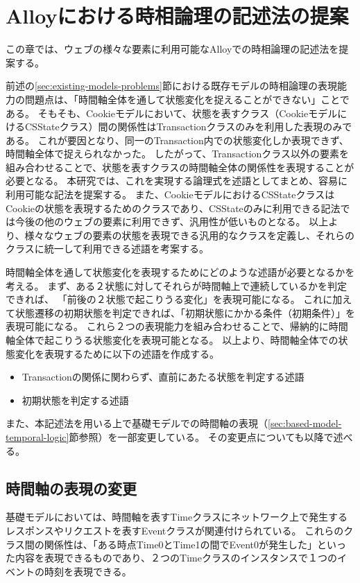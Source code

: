 \documentclass[12pt,a4paper]{jbook}
\begin{document}
\newpage

\chapter{Alloyにおける時相論理の記述法の提案}
\label{sec:ProposedModel-TemporalLogic}
この章では、ウェブの様々な要素に利用可能なAlloyでの時相論理の記述法を提案する。

前述の\ref{sec:existing-models-problems}節における既存モデルの時相論理の表現能力の問題点は、「時間軸全体を通して状態変化を捉えることができない」ことである。
そもそも、Cookieモデルにおいて、状態を表すクラス（CookieモデルにけるCSStateクラス）間の関係性はTransactionクラスのみを利用した表現のみである。
これが要因となり、同一のTransaction内での状態変化しか表現できず、時間軸全体で捉えられなかった。
したがって、Transactionクラス以外の要素を組み合わせることで、状態を表すクラスの時間軸全体の関係性を表現することが必要となる。
本研究では、これを実現する論理式を述語としてまとめ、容易に利用可能な記法を提案する。
また、CookieモデルにおけるCSStateクラスはCookieの状態を表現するためのクラスであり、CSStateのみに利用できる記法では今後の他のウェブの要素に利用できず、汎用性が低いものとなる。
以上より、様々なウェブの要素の状態を表現できる汎用的なクラスを定義し、それらのクラスに統一して利用できる述語を考案する。

時間軸全体を通して状態変化を表現するためにどのような述語が必要となるかを考える。
まず、ある２状態に対してそれらが時間軸上で連続しているかを判定できれば、
「前後の２状態で起こりうる変化」を表現可能になる。
これに加えて状態遷移の初期状態を判定できれば、「初期状態にかかる条件（初期条件）」を表現可能になる。
これら２つの表現能力を組み合わせることで、帰納的に時間軸全体で起こりうる状態変化を表現可能となる。
以上より、時間軸全体での状態変化を表現するために以下の述語を作成する。
\begin{itemize}
\item Transactionの関係に関わらず、直前にあたる状態を判定する述語
\item 初期状態を判定する述語
\end{itemize}

また、本記述法を用いる上で基礎モデルでの時間軸の表現（\ref{sec:based-model-temporal-logic}節参照）を一部変更している。
その変更点についても以降で述べる。

\section{時間軸の表現の変更}
基礎モデル\cite{based-model}においては、時間軸を表すTimeクラスにネットワーク上で発生するレスポンスやリクエストを表すEventクラスが関連付けられている。
これらのクラス間の関係性は、「ある時点Time0とTime1の間でEvent0が発生した」といった内容を表現できるものであり、２つのTimeクラスのインスタンスで１つのイベントの時刻を表現できる。
\end{document}
